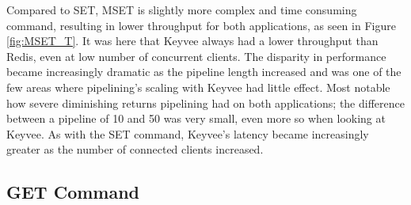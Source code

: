 \documentclass[english,10pt,twocolumn]{article}
\begin{document}
Compared to SET, MSET is slightly more complex and time consuming command, resulting in lower throughput for both applications, as seen in Figure \ref{fig:MSET_T}.
It was here that Keyvee always had a lower throughput than Redis, even at low number of concurrent clients.
The disparity in performance became increasingly dramatic as the pipeline length increased and was one of the few areas where pipelining's scaling with Keyvee had little effect.
Most notable how severe diminishing returns pipelining had on both applications; the difference between a pipeline of 10 and 50 was very small, even more so when looking at Keyvee.
As with the SET command, Keyvee's latency became increasingly greater as the number of connected clients increased.

\subsection{GET Command}
\end{document}
